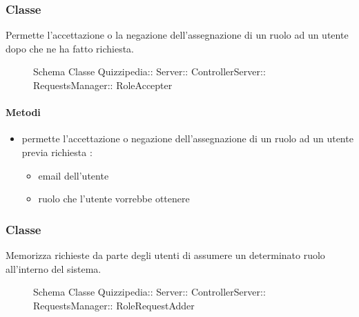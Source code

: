 \subsubsection{Classe }
Permette l'accettazione o la negazione dell'assegnazione di un ruolo ad un utente dopo che ne ha fatto richiesta.
\begin{figure}[H]
\centering
\noindent{}
\caption[Schema Classe RoleAccepter]{Schema Classe Quizzipedia:: Server:: ControllerServer:: RequestsManager:: RoleAccepter}
\end{figure}
\paragraph{Metodi}
\begin{itemize}
\item {}
\newline
permette l'accettazione o negazione dell'assegnazione di un ruolo ad un utente previa richiesta
\newline
{} :
\begin{itemize}
\item {}
\newline
email dell'utente
\item {}
\newline
ruolo che l'utente vorrebbe ottenere
\end{itemize}
\end{itemize}
\subsubsection{Classe }
Memorizza richieste da parte degli utenti di assumere un determinato ruolo all'interno del sistema.
\begin{figure}[H]
\centering
\noindent{}
\caption[Schema Classe RoleRequestAdder]{Schema Classe Quizzipedia:: Server:: ControllerServer:: RequestsManager:: RoleRequestAdder}
\end{figure}
